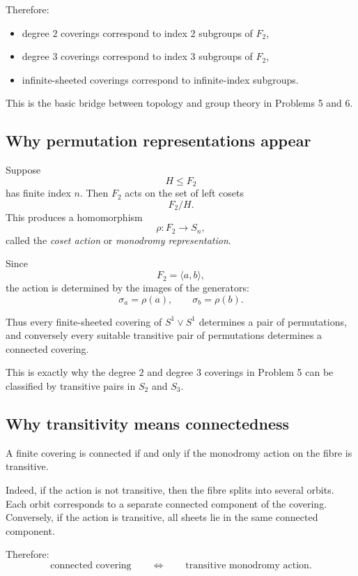 \documentclass[12pt,a4paper]{article}
\theoremstyle{notespace}
\begin{document}
Therefore:
\begin{itemize}
	\item degree \(2\) coverings correspond to index \(2\) subgroups of \(F_2\),
	\item degree \(3\) coverings correspond to index \(3\) subgroups of \(F_2\),
	\item infinite-sheeted coverings correspond to infinite-index subgroups.
\end{itemize}

This is the basic bridge between topology and group theory in Problems 5 and 6.

\bigskip

\subsection{Why permutation representations appear}

Suppose
\[
H\leq F_2
\]
has finite index \(n\). Then \(F_2\) acts on the set of left cosets
\[
F_2/H.
\]
This produces a homomorphism
\[
\rho:F_2\to S_n,
\]
called the \emph{coset action} or \emph{monodromy representation}.

Since
\[
F_2=\langle a,b\rangle,
\]
the action is determined by the images of the generators:
\[
\sigma_a=\rho(a),\qquad \sigma_b=\rho(b).
\]

Thus every finite-sheeted covering of \(S^1\vee S^1\) determines a pair of permutations, and conversely every suitable transitive pair of permutations determines a connected covering.

This is exactly why the degree \(2\) and degree \(3\) coverings in Problem 5 can be classified by transitive pairs in \(S_2\) and \(S_3\).

\bigskip

\subsection{Why transitivity means connectedness}

A finite covering is connected if and only if the monodromy action on the fibre is transitive.

Indeed, if the action is not transitive, then the fibre splits into several orbits. Each orbit corresponds to a separate connected component of the covering. Conversely, if the action is transitive, all sheets lie in the same connected component.

Therefore:
\[
\text{connected covering}
\qquad\Longleftrightarrow\qquad
\text{transitive monodromy action}.
\]
\end{document}
